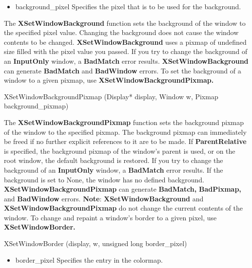 \documentclass{report}
\begin{document}
\begin{itemize}
            \begin{itemize}
                \item background\_pixel Specifies the pixel that is to be used for the background.
            \end{itemize}
            The \textbf{XSetWindowBackground} function sets the background of the window to the specified pixel value. Changing the background does not cause the window contents to be changed. \textbf{XSetWindowBackground} uses a pixmap of undefined size filled with the pixel value you passed. If you try to change the background of an \textbf{InputOnly} window, a \textbf{BadMatch} error results.
            \bigbreak \noindent 
            \textbf{XSetWindowBackground} can generate \textbf{BadMatch} and \textbf{BadWindow} errors.
            \bigbreak \noindent 
            To set the background of a window to a given pixmap, use \textbf{XSetWindowBackgroundPixmap.}
            \bigbreak \noindent 
            \begin{cppcode}
                XSetWindowBackgroundPixmap (Display* display, Window w, Pixmap background_pixmap)
            \end{cppcode}
            \bigbreak \noindent 
            The \textbf{XSetWindowBackgroundPixmap} function sets the background pixmap of the window to the specified pixmap. The background pixmap can immediately be freed if no further explicit references to it are to be made. If \textbf{ParentRelative} is specified, the background pixmap of the window’s parent is used, or on the root window, the default background is restored. If you try to change the background of an \textbf{InputOnly} window, a \textbf{BadMatch} error results. If the background is set to None, the window has no defined background.
            \bigbreak \noindent 
            \textbf{XSetWindowBackgroundPixmap} can generate \textbf{BadMatch,} \textbf{BadPixmap,} and \textbf{BadWindow} errors.
            \bigbreak \noindent 
            \textbf{Note}: \textbf{XSetWindowBackground} and \textbf{XSetWindowBackgroundPixmap} do not change the current contents of the window.
            \bigbreak \noindent 
            To change and repaint a window’s border to a given pixel, use \textbf{XSetWindowBorder.}
            \bigbreak \noindent 
            \begin{cppcode}
                XSetWindowBorder (display, w, unsigned long border_pixel)
            \end{cppcode}
            \begin{itemize}
                \item border\_pixel Specifies the entry in the colormap.

\end{itemize}
\end{itemize}
\end{document}

